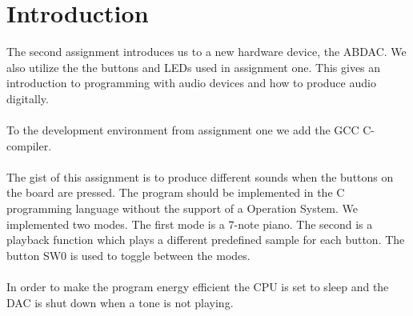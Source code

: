 \section{Introduction}
The second assignment introduces us to a new hardware device, the ABDAC. We also utilize the
the buttons and LEDs used in assignment one. This gives an introduction to programming with
audio devices and how to produce audio digitally.\\
\\
To the development environment from assignment one we add the GCC C-compiler.\\
\\
The gist of this assignment is to produce different sounds when the buttons on the board are pressed.
The program should be implemented in the C programming language without the support of a
Operation System. We implemented two modes. The first mode is a 7-note piano. The second is a
playback function which plays a different predefined sample for each button. The button SW0
is used to toggle between the modes.\\
\\
In order to make the program energy efficient the CPU is set to sleep and the DAC is shut down when
a tone is not playing.
